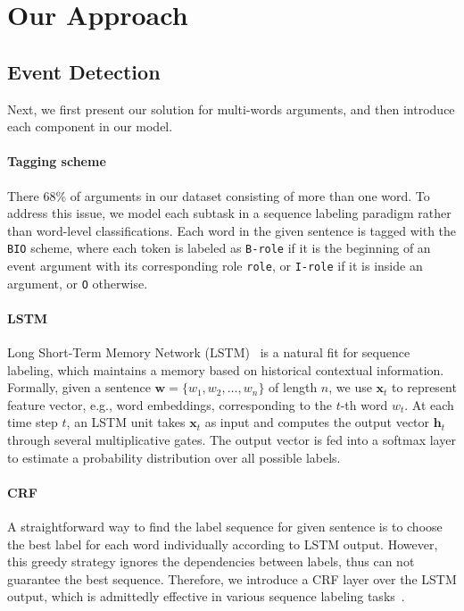 \section{Our Approach}
\subsection{Event Detection \label{evede}}
Next, we first present our solution for multi-words arguments, and then introduce each component in our model.

\paragraph{Tagging scheme}
There 68\%  of  arguments in our dataset consisting of more than one word. To address this issue, we model each subtask in a sequence labeling paradigm rather than word-level classifications. Each word in the given sentence is tagged with the \texttt{BIO} scheme, where each token is labeled as \texttt{B-role} if it is the beginning of an event argument with its corresponding role \texttt{role}, or \texttt{I-role} if it is inside an argument, or \texttt{O} otherwise. 

\paragraph{LSTM}
Long Short-Term Memory Network (LSTM)~\cite{hochreiter1997long} is a natural fit for sequence labeling, which maintains a memory based on historical contextual information. Formally, given a sentence $\bm{w} = \{w_1, w_2, \dots, w_n\}$ of length $n$, we use $\textbf{x}_t$ to represent feature vector, e.g., word embeddings, corresponding to the $t$-th word $w_t$. At each time step $t$, an LSTM unit takes $\textbf{x}_t$ as input and computes the output vector $\textbf{h}_t$ through several multiplicative gates. The output vector is fed into a softmax layer to estimate a probability distribution over all possible labels.

\paragraph{CRF}
A straightforward way to find the label sequence for given sentence is to choose the 
best label for each word individually according to LSTM output.  
However, this greedy strategy ignores the dependencies between labels, thus can not guarantee the best sequence.  %
Therefore, we introduce a CRF layer over the LSTM output, which is admittedly effective in various sequence labeling tasks~\cite{collobert2011natural,huang2015bidirectional}. %

